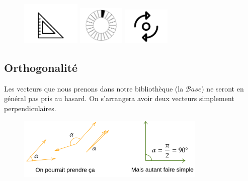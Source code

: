 \documentclass[
	11pt, %
	fleqn, %
	a4paper, %
]{LegrandOrangeBook}
\begin{document}
\begin{figure}[H] %
	\centering %
	\includegraphics[width=0.25\textwidth]{Images/tri.png} %
    \includegraphics[width=0.2\textwidth]{Images/one.png} %
    \includegraphics[width=0.2\textwidth]{Images/rot.png} %

\end{figure}




\subsection{Orthogonalité}
Les vecteurs que nous prenons dans notre bibliothèque (la $\mathcal{B}ase$) ne seront en général pas pris au hasard. On s'arrangera avoir deux vecteurs simplement perpendiculaires. 

\begin{figure}[H] %
	\centering %
	\includegraphics[width=0.8\textwidth]{Images/ortho1.png} %
	\label{ortho1} %
\end{figure}
\end{document}
